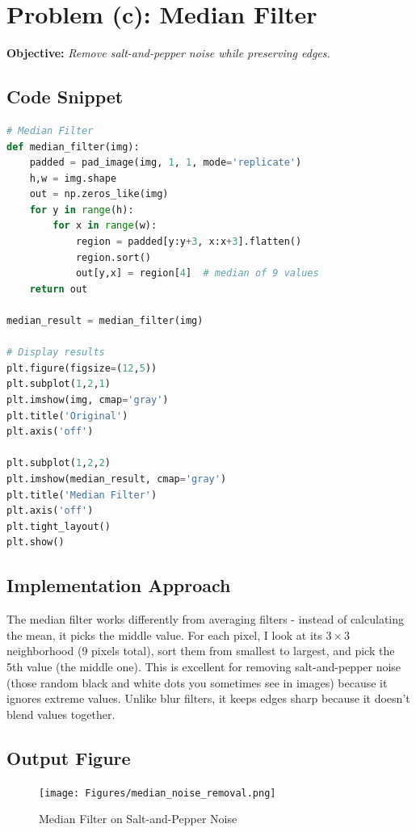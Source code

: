 \documentclass[12pt,a4paper]{report}
\begin{document}
\section{Problem (c): Median Filter}
\textbf{Objective:} \textit{Remove salt-and-pepper noise while preserving edges.}

\subsection{Code Snippet}
\begin{lstlisting}[language=Python, caption={Median Filter (3x3)}]
# Median Filter
def median_filter(img):
    padded = pad_image(img, 1, 1, mode='replicate')
    h,w = img.shape
    out = np.zeros_like(img)
    for y in range(h):
        for x in range(w):
            region = padded[y:y+3, x:x+3].flatten()
            region.sort()
            out[y,x] = region[4]  # median of 9 values
    return out

median_result = median_filter(img)

# Display results
plt.figure(figsize=(12,5))
plt.subplot(1,2,1)
plt.imshow(img, cmap='gray')
plt.title('Original')
plt.axis('off')

plt.subplot(1,2,2)
plt.imshow(median_result, cmap='gray')
plt.title('Median Filter')
plt.axis('off')
plt.tight_layout()
plt.show()
\end{lstlisting}

\subsection{Implementation Approach}
The median filter works differently from averaging filters - instead of calculating the mean, it picks the middle value. For each pixel, I look at its \(3\times 3\) neighborhood (9 pixels total), sort them from smallest to largest, and pick the 5th value (the middle one). This is excellent for removing salt-and-pepper noise (those random black and white dots you sometimes see in images) because it ignores extreme values. Unlike blur filters, it keeps edges sharp because it doesn't blend values together.

\subsection{Output Figure}
\begin{figure}[H]
\centering
\texttt{[image: Figures/median\_noise\_removal.png]}
\caption{Median Filter on Salt-and-Pepper Noise}
\end{figure}
\end{document}
